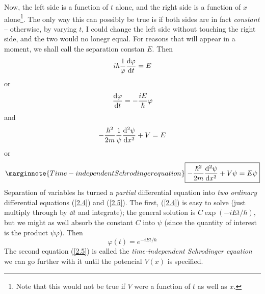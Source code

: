 Now, the left side is a function of $t$ alone, and the right side is a function of $x$ alone\footnote{Note that this would not be true if $V$ were a function of $t$ as well as $x$.}. The only way this can possibly be true is if both sides are in fact \textit{constant} -- otherwise, by varying $t$, I could change the left side without touching the right side, and the two would no lonegr equal. For reasons that will appear in a moment, we shall call the separation constan $E$. Then
\begin{equation*}
	i\hbar\frac{1}{\varphi}\dv{\varphi}{t}=E
\end{equation*}
or
\begin{equation*}\label{2.4}
	\dv{\varphi}{t}=-\frac{iE}{\hbar}\varphi
\end{equation*}
and
\begin{equation}
	-\frac{\hbar^2}{2m}\frac{1}{\psi}\dv[2]{\psi}{x}+V=E
\end{equation}
or
\begin{equation}\label{2.5}\marginnote{Time-independent Schrodinger equation}
	\boxed{-\frac{\hbar^2}{2m}\dv[2]{\psi}{x}+V\psi=E\psi}
\end{equation}
Separation of variables hs turned a \textit{partial} differential equation into \textit{two ordinary} differential equations (\ref{2.4}) and (\ref{2.5}). The first, (\ref{2.4}) is easy to solve (just multiply through by $\dd t$ and integrate); the general solution is $C\exp(-iEt/\hbar)$, but we might as well absorb the constant $C$ into $\psi$ (since the quantity of interest is the product $\psi\varphi$). Then
\begin{equation}\label{2.6}
	\varphi(t)=e^{-iEt/\hbar}
\end{equation}
The second equation (\ref{2.5}) is called the \textit{time-independent Schrodinger equation} we can go further with it until the potencial $V(x)$ is specified.


